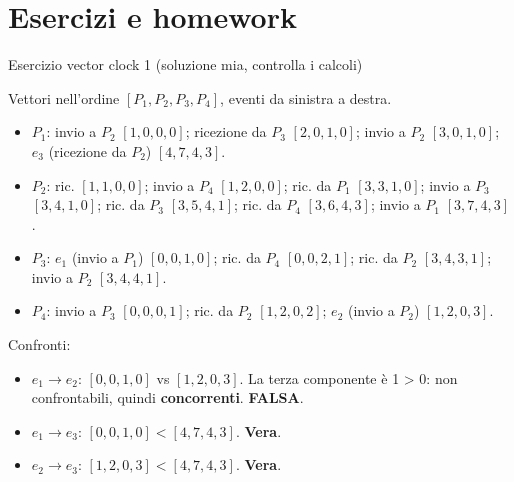 \section{Esercizi e homework}

\begin{approfondimento}{Esercizio vector clock 1 (soluzione mia, controlla i calcoli)}

Vettori nell'ordine \([P_1, P_2, P_3, P_4]\), eventi da sinistra a destra.

\begin{itemize}
\tightlist
\item
  \(P_1\): invio a \(P_2\) \([1,0,0,0]\); ricezione da \(P_3\) \([2,0,1,0]\); invio a \(P_2\) \([3,0,1,0]\); \(e_3\) (ricezione da \(P_2\)) \([4,7,4,3]\).
\item
  \(P_2\): ric. \([1,1,0,0]\); invio a \(P_4\) \([1,2,0,0]\); ric. da \(P_1\) \([3,3,1,0]\); invio a \(P_3\) \([3,4,1,0]\); ric. da \(P_3\) \([3,5,4,1]\); ric. da \(P_4\) \([3,6,4,3]\); invio a \(P_1\) \([3,7,4,3]\).
\item
  \(P_3\): \(e_1\) (invio a \(P_1\)) \([0,0,1,0]\); ric. da \(P_4\) \([0,0,2,1]\); ric. da \(P_2\) \([3,4,3,1]\); invio a \(P_2\) \([3,4,4,1]\).
\item
  \(P_4\): invio a \(P_3\) \([0,0,0,1]\); ric. da \(P_2\) \([1,2,0,2]\); \(e_2\) (invio a \(P_2\)) \([1,2,0,3]\).
\end{itemize}

Confronti:

\begin{itemize}
\tightlist
\item
  \(e_1 \to e_2\): \([0,0,1,0]\) vs \([1,2,0,3]\). La terza componente è 1 \textgreater{} 0: non confrontabili, quindi \textbf{concorrenti}. \textbf{FALSA}.
\item
  \(e_1 \to e_3\): \([0,0,1,0] < [4,7,4,3]\). \textbf{Vera}.
\item
  \(e_2 \to e_3\): \([1,2,0,3] < [4,7,4,3]\). \textbf{Vera}.
\end{itemize}

\end{approfondimento}

